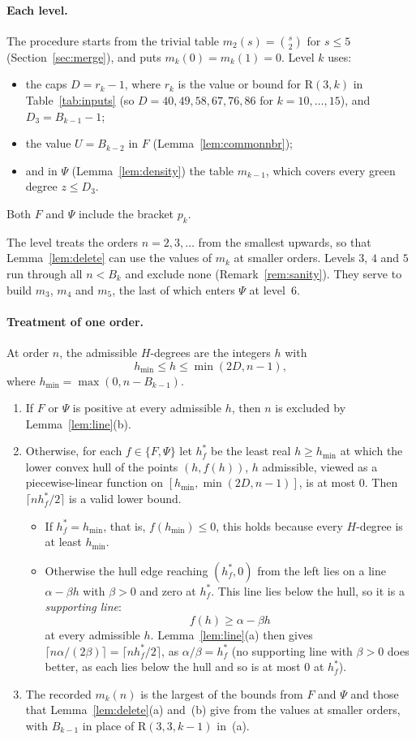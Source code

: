 \documentclass[11pt]{article}
\theoremstyle{spacedplain}
\theoremstyle{spaceddef}
\theoremstyle{spacedremark}
\newcommand{\R}{\mathrm{R}}
\begin{document}
\paragraph{Each level.}
The procedure starts from the trivial table $m_2(s)=\binom s2$ for $s\le 5$ (Section~\ref{sec:merge}), and puts $m_k(0)=m_k(1)=0$.
Level $k$ uses:
\begin{itemize}
\item the caps $D=r_k-1$, where $r_k$ is the value or bound for $\R(3,k)$ in Table~\ref{tab:inputs} (so $D=40,49,58,67,76,86$ for $k=10,\dots,15$), and $D_3=B_{k-1}-1$;
\item the value $U=B_{k-2}$ in $F$ (Lemma~\ref{lem:commonnbr});
\item and in $\Psi$ (Lemma~\ref{lem:density}) the table $m_{k-1}$, which covers every green degree $z\le D_3$.
\end{itemize}
Both $F$ and $\Psi$ include the bracket $p_k$.

The level treats the orders $n=2,3,\dots$ from the smallest upwards, so that Lemma~\ref{lem:delete} can use the values of $m_k$ at smaller orders.
Levels $3$, $4$ and $5$ run through all $n<B_k$ and exclude none (Remark~\ref{rem:sanity}).
They serve to build $m_3$, $m_4$ and $m_5$, the last of which enters $\Psi$ at level~$6$.

\paragraph{Treatment of one order.}
At order $n$, the admissible $H$-degrees are the integers $h$ with
\[
h_{\min}\le h\le\min(2D,n-1),
\]
where $h_{\min}=\max(0,n-B_{k-1})$.
\begin{enumerate}[label=(\roman*)]
\item If $F$ or $\Psi$ is positive at every admissible $h$, then $n$ is excluded by Lemma~\ref{lem:line}(b).
\item Otherwise, for each $f\in\{F,\Psi\}$ let $h^*_f$ be the least real $h\ge h_{\min}$ at which the lower convex hull of the points $(h,f(h))$, $h$ admissible, viewed as a piecewise-linear function on $[h_{\min},\min(2D,n-1)]$, is at most $0$.
Then $\lceil nh^*_f/2\rceil$ is a valid lower bound.
\begin{itemize}
\item If $h^*_f=h_{\min}$, that is, $f(h_{\min})\le 0$, this holds because every $H$-degree is at least $h_{\min}$.
\item Otherwise the hull edge reaching $(h^*_f,0)$ from the left lies on a line $\alpha-\beta h$ with $\beta>0$ and zero at $h^*_f$.
This line lies below the hull, so it is a \emph{supporting line}:
\[
f(h)\ge\alpha-\beta h
\]
at every admissible $h$.
Lemma~\ref{lem:line}(a) then gives $\lceil n\alpha/(2\beta)\rceil=\lceil nh^*_f/2\rceil$, as $\alpha/\beta=h^*_f$ (no supporting line with $\beta>0$ does better, as each lies below the hull and so is at most $0$ at $h^*_f$).
\end{itemize}
\item The recorded $m_k(n)$ is the largest of the bounds from $F$ and $\Psi$ and those that Lemma~\ref{lem:delete}(a) and~(b) give from the values at smaller orders, with $B_{k-1}$ in place of $\R(3,3,k-1)$ in~(a).
\end{enumerate}
\end{document}

